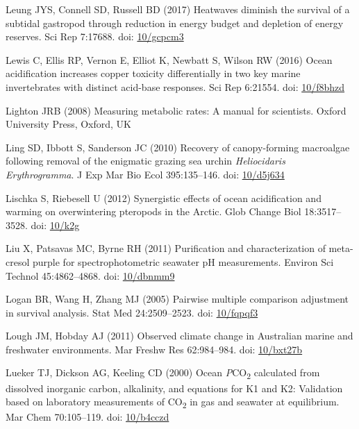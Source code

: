 \documentclass[a4paper,10pt, oneside]{memoir}
\begin{document}
\leavevmode\hypertarget{ref-Leung2017}{}%
Leung JYS, Connell SD, Russell BD (2017) Heatwaves diminish the survival of a subtidal gastropod through reduction in energy budget and depletion of energy reserves. Sci Rep 7:17688. doi: \href{https://doi.org/10/gcpcm3}{10/gcpcm3}

\leavevmode\hypertarget{ref-Lewis2016}{}%
Lewis C, Ellis RP, Vernon E, Elliot K, Newbatt S, Wilson RW (2016) Ocean acidification increases copper toxicity differentially in two key marine invertebrates with distinct acid-base responses. Sci Rep 6:21554. doi: \href{https://doi.org/10/f8bhzd}{10/f8bhzd}

\leavevmode\hypertarget{ref-Lighton2008}{}%
Lighton JRB (2008) Measuring metabolic rates: A manual for scientists. Oxford University Press, Oxford, UK

\leavevmode\hypertarget{ref-Ling2010}{}%
Ling SD, Ibbott S, Sanderson JC (2010) Recovery of canopy-forming macroalgae following removal of the enigmatic grazing sea urchin \emph{Heliocidaris} \emph{Erythrogramma}. J Exp Mar Bio Ecol 395:135--146. doi: \href{https://doi.org/10/d5j634}{10/d5j634}

\leavevmode\hypertarget{ref-Lischka2012}{}%
Lischka S, Riebesell U (2012) Synergistic effects of ocean acidification and warming on overwintering pteropods in the Arctic. Glob Change Biol 18:3517--3528. doi: \href{https://doi.org/10/k2g}{10/k2g}

\leavevmode\hypertarget{ref-Liu2011}{}%
Liu X, Patsavas MC, Byrne RH (2011) Purification and characterization of meta-cresol purple for spectrophotometric seawater pH measurements. Environ Sci Technol 45:4862--4868. doi: \href{https://doi.org/10/dbnmm9}{10/dbnmm9}

\leavevmode\hypertarget{ref-Logan2005}{}%
Logan BR, Wang H, Zhang MJ (2005) Pairwise multiple comparison adjustment in survival analysis. Stat Med 24:2509--2523. doi: \href{https://doi.org/10/fqpqf3}{10/fqpqf3}

\leavevmode\hypertarget{ref-Lough2011}{}%
Lough JM, Hobday AJ (2011) Observed climate change in Australian marine and freshwater environments. Mar Freshw Res 62:984--984. doi: \href{https://doi.org/10/bxt27b}{10/bxt27b}

\leavevmode\hypertarget{ref-Lueker2000}{}%
Lueker TJ, Dickson AG, Keeling CD (2000) Ocean \emph{P}CO\textsubscript{2} calculated from dissolved inorganic carbon, alkalinity, and equations for K1 and K2: Validation based on laboratory measurements of CO\textsubscript{2} in gas and seawater at equilibrium. Mar Chem 70:105--119. doi: \href{https://doi.org/10/b4cczd}{10/b4cczd}
\end{document}

